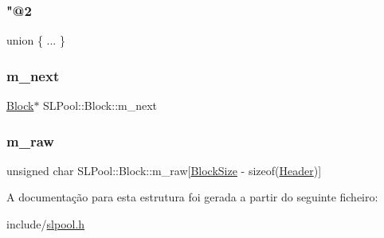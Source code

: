 \subsubsection{\texorpdfstring{"@2}{@2}}
{\footnotesize\ttfamily union \{ ... \} }

\mbox{\label{structSLPool_1_1Block_a4b7b155392ff1a250c936997e6fcd8a8}} 
\subsubsection{\texorpdfstring{m\+\_\+next}{m\_next}}
{\footnotesize\ttfamily \hyperlink{structSLPool_1_1Block}{Block}$\ast$ S\+L\+Pool\+::\+Block\+::m\+\_\+next}

\mbox{\label{structSLPool_1_1Block_a4dd3aef4630ff625cd9bc36c10bf7896}} 
\subsubsection{\texorpdfstring{m\+\_\+raw}{m\_raw}}
{\footnotesize\ttfamily unsigned char S\+L\+Pool\+::\+Block\+::m\+\_\+raw\mbox{[}\hyperlink{structSLPool_1_1Block_adbb416e65dd0d7aa2121e30b34424db8a32fd11caed7c39eb5ab3949a612a14b9}{Block\+Size} -\/ sizeof(\hyperlink{structSLPool_1_1Header}{Header})\mbox{]}}



A documentação para esta estrutura foi gerada a partir do seguinte ficheiro\+:\begin{DoxyCompactItemize}
\item 
include/\hyperlink{slpool_8h}{slpool.\+h}\end{DoxyCompactItemize}
